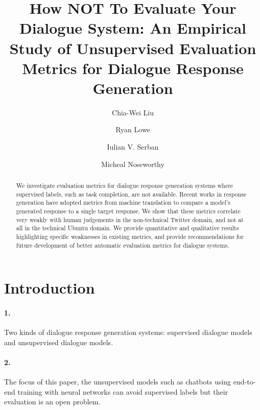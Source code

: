 \documentclass[runningheads]{llncs}
\begin{document}
\title{How NOT To Evaluate Your Dialogue System: An Empirical Study of
Unsupervised Evaluation Metrics for Dialogue Response Generation}

\author{Chia-Wei Liu  \and Ryan Lowe  \and
Iulian V. Serban  \and Micheal Noseworthy }


\maketitle

\begin{abstract}
    We investigate evaluation metrics for dialogue
    response generation systems where supervised
    labels, such as task completion, are not available.
    Recent works in response generation
    have adopted metrics from machine translation
    to compare a model’s generated response
    to a single target response. We show that
    these metrics correlate very weakly with human
    judgements in the non-technical Twitter
    domain, and not at all in the technical Ubuntu
    domain. We provide quantitative and qualitative
    results highlighting specific weaknesses
    in existing metrics, and provide recommendations
    for future development of better automatic
    evaluation metrics for dialogue systems.
\end{abstract}

\section{Introduction}
\paragraph{1.} Two kinds of dialogue response generation systems:
supervised dialogue models and unsupervised dialogue models.

\paragraph{2. } The focus of this paper,
the unsupervised models such as chatbots using end-to-end training
with neural networks can avoid supervised labels but their
evaluation is an open problem.
\end{document}
